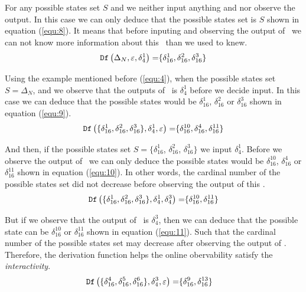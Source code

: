 For any possible states set $S$ and we neither input anything and nor observe the output. In this case we can only deduce that the possible states set is $S$ shown in equation (\ref{equ:8}). It means that before inputing and observing the output of \BCN\ we can not know more information about this \BCN\ than we used to knew.
\begin{equation}
\begin{split}
{\tt Df}\left(\Delta_N,\varepsilon,\delta_4^1\right)=&\{\delta_{16}^1,\delta_{16}^2,\delta_{16}^3\}\\
\end{split}
\label{equ:9}
\end{equation}
 
 Using the example mentioned before (\ref{equ:4}), when the possible states set $S=\Delta_N$, and  we observe that the outputs of \BCN\ is $\delta_4^1$ before we decide input. In this case we can deduce that the possible states would be $\delta_{16}^1$, $\delta_{16}^2$ or  $\delta_{16}^3$ shown in equation (\ref{equ:9}).
\begin{equation}
\begin{split}
{\tt Df}\left(\{\delta_{16}^1,\delta_{16}^2,\delta_{16}^3\},\delta_4^1,\varepsilon\right)=&\{\delta_{16}^{10},\delta_{16}^4,\delta_{16}^{11}\}\\
\end{split}
\label{equ:10}
\end{equation}

And then, if the possible states set $S=\{\delta_{16}^1$, $\delta_{16}^2$, $\delta_{16}^3\}$ we input $\delta_4^1$. Before we observe the output of \BCN\ we can only deduce the possible states would be $\delta_{16}^{10}$, $\delta_{16}^4$ or  $\delta_{16}^{11}$ shown in equation (\ref{equ:10}). In other words, the cardinal number of the possible states set did not decrease before observing the output of this \BCN.
\begin{equation}
\begin{split}
{\tt Df}\left(\{\delta_{16}^1,\delta_{16}^2,\delta_{16}^3\},\delta_4^1,\delta_4^3\right)=&\{\delta_{16}^{10},\delta_{16}^{11}\}\\
\end{split}
\label{equ:11}
\end{equation}

But if we observe that the output of \BCN\ is $\delta_4^3$, then we can deduce that the possible state can be $\delta_{16}^{10}$ or  $\delta_{16}^{11}$ shown in equation (\ref{equ:11}). Such that the cardinal number of the possible states set may decrease after observing the output of \BCN. Therefore, the derivation function helps the online obervability satisfy the {\em interactivity}.
\begin{equation}
\begin{split}
{\tt Df}\left(\{\delta_{16}^4,\delta_{16}^5,\delta_{16}^6\},\delta_4^3,\varepsilon\right)=&\{\delta_{16}^9,\delta_{16}^{13}\}
\end{split}
\label{equ:12}
\end{equation}


